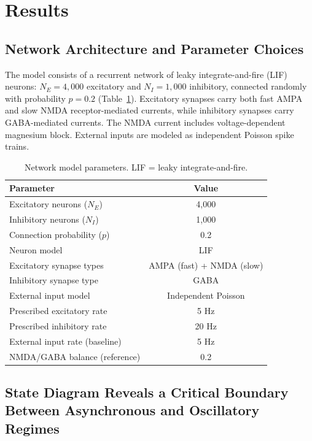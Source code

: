 \documentclass[11pt]{article}
\begin{document}
\section{Results}

\subsection{Network Architecture and Parameter Choices}

The model consists of a recurrent network of leaky integrate-and-fire (LIF) neurons: $N_E = 4{,}000$ excitatory and $N_I = 1{,}000$ inhibitory, connected randomly with probability $p = 0.2$ (Table~\ref{tab:network_params}). Excitatory synapses carry both fast AMPA and slow NMDA receptor-mediated currents, while inhibitory synapses carry GABA-mediated currents. The NMDA current includes voltage-dependent magnesium block. External inputs are modeled as independent Poisson spike trains.

\begin{table}[H]
\centering
\caption{Network model parameters. LIF = leaky integrate-and-fire.}
\label{tab:network_params}
\begin{tabular}{lc}
\toprule
\textbf{Parameter} & \textbf{Value} \\
\midrule
Excitatory neurons ($N_E$) & 4,000 \\
Inhibitory neurons ($N_I$) & 1,000 \\
Connection probability ($p$) & 0.2 \\
Neuron model & LIF \\
Excitatory synapse types & AMPA (fast) + NMDA (slow) \\
Inhibitory synapse type & GABA \\
External input model & Independent Poisson \\
Prescribed excitatory rate & 5 Hz \\
Prescribed inhibitory rate & 20 Hz \\
External input rate (baseline) & 5 Hz \\
NMDA/GABA balance (reference) & 0.2 \\
\bottomrule
\end{tabular}
\end{table}

\subsection{State Diagram Reveals a Critical Boundary Between Asynchronous and Oscillatory Regimes}
\end{document}
